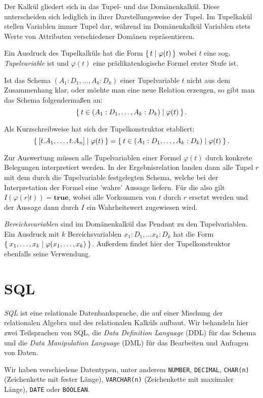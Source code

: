 \documentclass[a4paper,parskip=half*,DIV=15,fontsize=11pt]{scrartcl}
\begin{document}
Der Kalkül gliedert sich in das Tupel- und das Domänenkalkül. Diese unterscheiden sich lediglich in ihrer Darstellungsweise der Tupel. Im Tupelkakül stellen Variablen immer Tupel dar, während im Domänenkalkül Variablen stets Werte von Attributen verschiedener Domänen repräsentieren.

Ein Ausdruck des Tupelkalküls hat die Form $\set{ t | \varphi(t)}$ wobei $t$ eine sog. \textit{Tupelvariable} ist und $\varphi(t)$ eine prädikatenlogische Formel erster Stufe ist.

Ist das Schema $(A_1:D_1, \ldots, A_k:D_k)$ einer Tupelvariable $t$ nicht aus dem Zusammenhang klar, oder möchte man eine neue Relation erzeugen, so gibt man das Schema folgendermaßen an: $$\Set{t \in (A_1:D_1, \ldots, A_k:D_k) | \varphi(t)}.$$

Als Kurzschreibweise hat sich der Tupelkonstruktor etabliert: $$\Set{[t.A_1, \ldots, t.A_n] | \varphi(t)} = \Set{t \in (A_1:D_1, \ldots, A_k:D_k) | \varphi(t)}.$$

Zur Auswertung müssen alle Tupelvariablen einer Formel $\varphi(t)$ durch konkrete Belegungen interpretiert werden. In der Ergebnisrelation landen dann alle Tupel $r$ mit dem durch die Tupelvariable festgelegten Schema, welche bei der Interpretation der Formel eine 'wahre' Aussage liefern. Für die also gilt $I(\varphi(r|t)) = \textbf{true}$, wobei alle Vorkommen von $t$ durch $r$ ersetzt werden und der Aussage dann durch $I$ ein Wahrheitswert zugewiesen wird.

\textit{Bereichsvariablen} sind im Domänenkalkül das Pendant zu den Tupelvariablen. Ein Ausdruck mit $k$ Bereichsvariablen $x_1:D_1, \ldots x_k:D_k$ hat die Form $\Set{x_1, \ldots, x_k | \varphi(x_1, \ldots, x_k)}$. Außerdem findet hier der Tupelkonstruktor ebenfalls seine Verwendung.
\section{SQL}

\emph{SQL} ist eine relationale Datenbanksprache, die auf einer Mischung der relationalen Algebra und des relationalen Kalküls aufbaut. Wir behandeln hier zwei Teilsprachen von SQL, die \emph{Data Definition Language} (DDL) für das Schema und die \emph{Data Manipulation Language} (DML) für das Bearbeiten und Anfragen von Daten.

Wir haben verschiedene Datentypen, unter anderem \lstinline{NUMBER}, \lstinline{DECIMAL}, \lstinline{CHAR(n)} (Zeichenkette mit fester Länge), \lstinline{VARCHAR(n)} (Zeichenkette mit maximaler Länge), \lstinline{DATE} oder \lstinline{BOOLEAN}.
\end{document}
